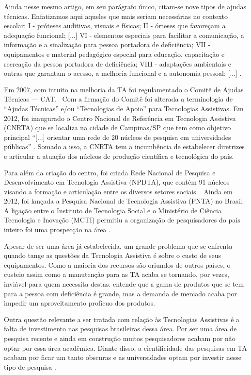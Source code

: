 \documentclass[portuguese]{textolivre}
\begin{document}
Ainda nesse mesmo artigo, em seu parágrafo único, citam-se nove tipos de
ajudas técnicas. Enfatizamos aqui aqueles que mais seriam necessárias no
contexto escolar: I - próteses auditivas, visuais e físicas; II -
órteses que favoreçam a adequação funcional; {[}...{]} VI - elementos
especiais para facilitar a comunicação, a informação e a sinalização
para pessoa portadora de deficiência; VII - equipamentos e material
pedagógico especial para educação, capacitação e recreação da pessoa
portadora de deficiência; VIII - adaptações ambientais e outras que
garantam o acesso, a melhoria funcional e a autonomia pessoal; {[}...{]}
\cite[Art.~19]{brasil1999}.

Em 2007, com intuito na melhoria da TA foi regulamentado o Comitê de
Ajudas Técnicas --- CAT.~ Com a firmação do Comitê foi alterada a
terminologia de ``Ajudas Técnicas'' e/ou ``Tecnologias de Apoio'' para
Tecnologias Assistivas. Em 2012, foi inaugurado o Centro Nacional de
Referência em Tecnologia Assistiva (CNRTA) que se localiza na cidade de
Campinas/SP que tem como objetivo principal ``{[}...{]} orientar uma
rede de 20 núcleos de pesquisa em universidades públicas'' \cite[p.~63-64]{brasil2013}. Somado a isso, a CNRTA tem a incumbência de estabelecer
diretrizes e articular a atuação dos núcleos de produção científica e
tecnológica do país.

Para além da criação do centro, foi criada Rede Nacional de Pesquisa e
Desenvolvimento em Tecnologia Assistiva (NPDTA), que contém 91 núcleos
visando a formação e articulação entre os diversos setores sociais.~
Ainda em 2012, foi lançada a Pesquisa Nacional de Tecnologia Assistiva
(PNTA) no Brasil. A ligação entre o Instituto de Tecnologia Social e o
Ministério de Ciência Tecnologia e Inovação (MCTI) permitiu a
organização de pesquisadores do país inteiro foi uma prospecção na área
\cite{brasil2013}.

Apesar de ser uma área já estabelecida, um grande problema que se
enfrenta quando tange as questões da Tecnologia Assistiva é sobre o
custo de seus equipamentos. Como a maioria dos recursos são oriundos de
outros países, o custeio assim como a manutenção para as TA acaba se
tornando, por vezes, inviável para quem necessita destas. \textcite{soares2017}
entende que a gama de produtos que se tem para a pessoa com deficiência
é grande, mas a demanda de mercado acaba por impedir um aproveitamento
profícuo dos produtos.

Outra questão relevante a ser tratada com relação às Tecnologias
Assistivas é a falta de investimento nas pesquisas brasileiras dessa
área. Por ser uma área de pesquisa recente e ainda em construção muitos
pesquisadores acabam por não optar por essa área acadêmica. Diante
disso, a cientificidade das pesquisas em TA acabam por ficar um tanto
obscuras e as universidades optam por investir nesse tipo de pesquisa
\cite{bersch2017}.
\end{document}
